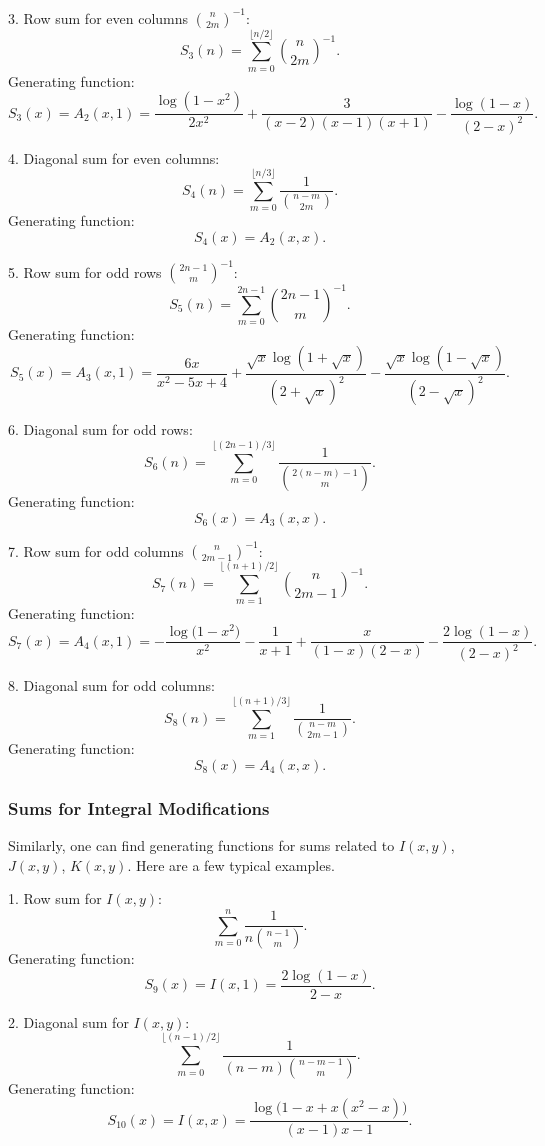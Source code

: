 \documentclass[12pt]{article}
\begin{document}
3. Row sum for even columns \( \binom{n}{2m}^{-1} \):
   \[
   S_3(n) = \sum_{m=0}^{\lfloor n/2 \rfloor} \binom{n}{2m}^{-1}.
   \]
   Generating function:
   \[
   S_3(x) = A_2(x, 1) =
   \frac{\log(1\!-x^2)}{2x^2}\! + \frac{3}{(x-2)(x-\!1)(x+\!1)}  - \frac{\log(1\!-x)}{(2-x)^2}.
   \]

4. Diagonal sum for even columns:
   \[
   S_4(n) = \sum_{m=0}^{\lfloor n/3 \rfloor} \frac{1}{\binom{n-m}{2m}}.
   \]
   Generating function:
   \[
   S_4(x) = A_2(x, x).
   \]

5. Row sum for odd rows \( \binom{2n-1}{m}^{-1} \):
   \[
   S_5(n) = \sum_{m=0}^{2n-1} \binom{2n-1}{m}^{-1}.
   \]
   Generating function:
   \[
   S_5(x) = A_3(x, 1) =
   \frac{6x}{x^2-5x+4}
   + \frac{\sqrt{x}\log(1+\sqrt{x})}{(2+\sqrt{x})^2}
   - \frac{\sqrt{x}\log(1-\sqrt{x})}{(2-\sqrt{x})^2}.
   \]

6. Diagonal sum for odd rows:
   \[
   S_6(n) = \sum_{m=0}^{\lfloor (2n-1)/3 \rfloor} \frac{1}{\binom{2(n-m)-1}{m}}.
   \]
   Generating function:
   \[
   S_6(x) = A_3(x, x).
   \]

7. Row sum for odd columns \( \binom{n}{2m-1}^{-1} \):
   \[
   S_7(n) = \sum_{m=1}^{\lfloor (n+1)/2 \rfloor} \binom{n}{2m-1}^{-1}.
   \]
   Generating function:
   \[
   S_7(x) = A_4(x, 1) =
   - \frac{\log\!\bigl(1-x^2\bigr)}{x^2}
   - \frac{1}{x+1}
   + \frac{x}{(1-x)(2-x)}
   - \frac{2\log(1-x)}{(2-x)^2}.
   \]

8. Diagonal sum for odd columns:
   \[
   S_8(n) = \sum_{m=1}^{\lfloor (n+1)/3 \rfloor} \frac{1}{\binom{n-m}{2m-1}}.
   \]
   Generating function:
   \[
   S_8(x) = A_4(x, x).
   \]

\subsubsection{Sums for Integral Modifications}

Similarly, one can find generating functions for sums related to \( I(x,y) \),\\ \( J(x,y) \), \( K(x,y) \). Here are a few typical examples.

1. Row sum for \( I(x,y) \):
   \[
   \sum_{m=0}^{n} \frac{1}{n \binom{n-1}{m}}.
   \]
   Generating function:
   \[
   S_9(x) = I(x, 1) = \frac{2\log(1-x)}{2-x}.
   \]

2. Diagonal sum for \( I(x,y) \):
   \[
   \sum_{m=0}^{\lfloor (n-1)/2 \rfloor} \frac{1}{(n-m) \binom{n-m-1}{m}}.
   \]
   Generating function:
   \[
   S_{10}(x) = I(x, x) = \frac{\log\!\bigl(1 - x + x(x^2 - x)\bigr)}{(x-1)x - 1}.
   \]
\end{document}
